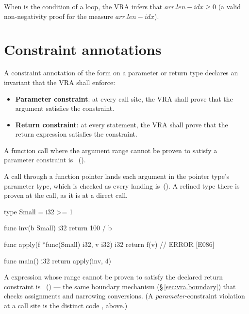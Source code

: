 \pnum
When  is the condition of a 
loop, the VRA infers that $\mathit{arr.len} - \mathit{idx} \geq 0$ (a
valid non-negativity proof for the measure $\mathit{arr.len} - \mathit{idx}$).

\section{Constraint annotations}
\label{sec:vra.constraints}

\pnum
A constraint annotation of the form  on a parameter or
return type declares an invariant that the VRA shall enforce:

\begin{itemize}
  \item \textbf{Parameter constraint}: at every call site, the VRA shall
        prove that the argument satisfies the constraint.
  \item \textbf{Return constraint}: at every  statement, the
        VRA shall prove that the return expression satisfies the constraint.
\end{itemize}

\begin{constraint}
  A function call where the argument range cannot be proven to satisfy
  a parameter constraint is \illformed{}~().
\end{constraint}

\pnum
A call through a function pointer lands each argument in the pointer type's parameter type, which
is checked as every landing is~().  A refined type there is proven at the call, as
it is at a direct call.

\begin{laincode}
type Small = i32 >= 1

func inv(b Small) i32 { return 100 / b }

func apply(f *func(Small) i32, v i32) i32 {
    return f(v)    // ERROR [E086]
}

func main() i32 {
    return apply(inv, 4)
}
\end{laincode}

\begin{constraint}
  A  expression whose range cannot be proven to satisfy the
  declared return constraint is \illformed{}~() --- the same
  boundary mechanism (\S\,\ref{sec:vra.boundary}) that checks assignments and
  narrowing conversions.  (A \emph{parameter}-constraint violation at a call
  site is the distinct code , above.)
\end{constraint}

